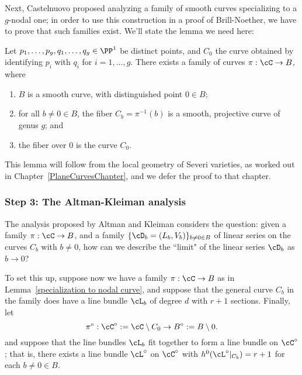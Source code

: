 Next, Castelnuovo proposed analyzing a family of smooth curves specializing to a $g$-nodal one; in order to use this construction in a proof of Brill-Noether, we have to prove that such families exist. We'll state the lemma we need here:

\begin{lemma}\label{specialization to nodal curve}
Let $p_1,\dots,p_g, q_1,\dots, q_g \in \PP^1$ be distinct points, and $C_0$ the curve obtained by identifying $p_i$ with $q_i$ for $i = 1,\dots,g$. There exists a family of curves $\pi : \cC \to B$, where
\begin{enumerate}
\item $B$ is a smooth curve, with distinguished point $0 \in B$;
\item for all $b \neq 0 \in B$, the fiber $C_b = \pi^{-1}(b)$ is a smooth, projective curve of genus $g$;  and
\item the fiber over $0$ is the curve $C_0$.
\end{enumerate}
\end{lemma}

This lemma will follow from the local geometry of Severi varieties, as worked out in Chapter~\ref{PlaneCurvesChapter}, and we defer the proof to that chapter.

%
%

\subsubsection{Step 3: The Altman-Kleiman analysis}

The analysis proposed by Altman and Kleiman considers the question: given a family $\pi : \cC \to B$, and a family $\{ \cD_b = (L_b, V_b)\}_{b \neq 0 \in B}$ of linear series on the curves $C_b$ with $b \neq 0$, how can we describe the ``limit" of the linear series $\cD_b$ as $b \to 0$? 

To set this up, suppose now we have a family $\pi : \cC \to B$ as in Lemma~\ref{specialization to nodal curve}, and suppose that the general curve $C_b$ in the family does have a line bundle $\cL_b$ of degree $d$ with $r+1$ sections. Finally, let 
$$
\pi^\circ: \cC^\circ := \cC \setminus C_0\to B^\circ := B\setminus 0.
$$
and suppose that the line bundles $\cL_b$ fit together to form a line bundle on $\cC^\circ$; that is, there exists a line bundle $\cL^\circ$ on $\cC^\circ$ with $h^0(\cL^\circ|_{C_b}) = r+1$ for each $b \neq 0 \in B$. 


